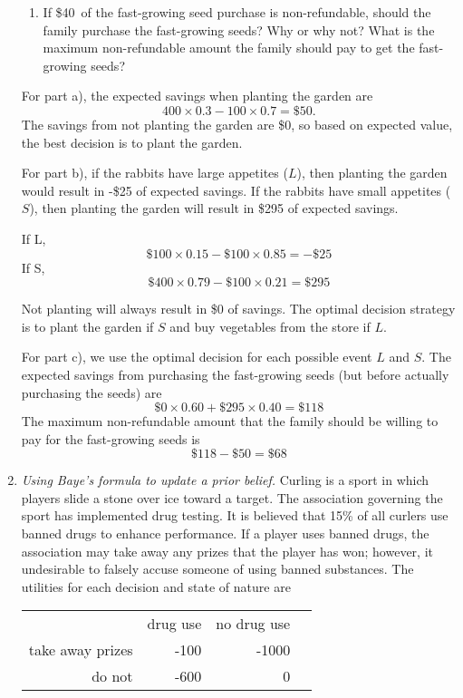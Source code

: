 \begin{enumerate}
\begin{enumerate}
    \item If \$40\ of the fast-growing seed purchase is non-refundable, should the family purchase the fast-growing seeds? Why or why not? What is the maximum non-refundable amount the family should pay to get the fast-growing seeds?
\end{enumerate}

\begin{solution}
\bs For part a), the expected savings when planting the garden are
\[ 400 \times 0.3  - 100 \times 0.7 = \$50. \]
The savings from not planting the garden are \$0, so based on expected value,
the best decision is to plant the garden.

For part b), if the rabbits have large appetites ($L$), then planting 
the garden would result in -\$25 of expected savings.
If the rabbits have small appetites ($S$), then planting the garden will result in \$295 
of expected savings. 

If L, \[ \$100 \times 0.15 - \$100 \times 0.85 = -\$25 \]
If S, \[ \$400 \times 0.79 - \$100 \times 0.21 = \$295 \]

Not planting will always result in \$0 of savings. 
The optimal decision strategy is to plant the garden if $S$ and buy vegetables 
from the store if $L$.

For part c), we use the optimal decision for each possible event $L$ and $S$. 
The expected savings from purchasing the fast-growing seeds
(but before actually purchasing the seeds) are
\[ \$0 \times 0.60 + \$295 \times 0.40 = \$118 \]
The maximum non-refundable amount that the family should be willing 
to pay for the fast-growing seeds is
\[ \$118 - \$50 = \$68 \]
\end{solution}

\item \emph{Using Baye's formula to update a prior belief.}
Curling is a sport in which players slide a stone over ice toward a
target. The association governing the sport has implemented drug
testing. It is believed that 15\% of all curlers use banned drugs to
enhance performance. If a player uses banned drugs, the association
may take away any prizes that the player has won; however, it
undesirable to falsely accuse someone of using banned substances.  The
utilities for each decision and state of nature are

\begin{center}
\begin{tabular}{rrrr}
& drug use & no drug use \\ \cline{2-3}
take away prizes & -100 & -1000 \\
do not & -600 & 0 
\end{tabular}
\end{center}


\end{enumerate}
